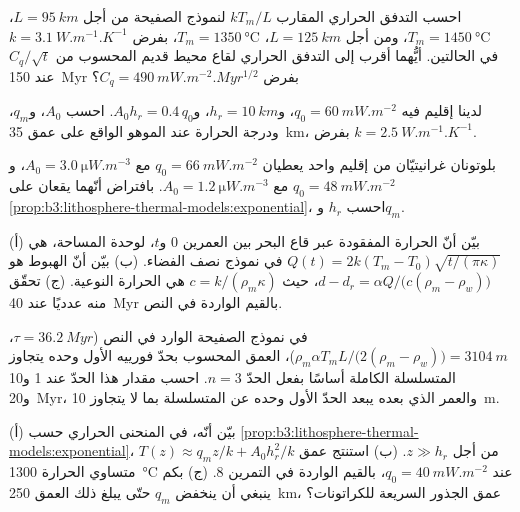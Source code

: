 \begin{exercise}[$\star\star$]\label{exo:b3:lithosphere-thermal-models:7}
احسب التدفق الحراري المقارب $kT_m/L$ لنموذج الصفيحة من أجل $L =
\qty{95}{km}$، $T_m = \qty{1450}{\celsius}$، ومن أجل $L = \qty{125}{km}$،
$T_m = \qty{1350}{\celsius}$، بفرض $k = \qty{3.1}{W.m^{-1}.K^{-1}}$ في الحالتين.
أيُّهما أقرب إلى التدفق الحراري لقاع محيط قديم المحسوب من $C_q/\sqrt t$
عند \qty{150}{Myr} بفرض $C_q = \qty{490}{mW.m^{-2}.Myr^{1/2}}$؟
\end{exercise}

\begin{exercise}[$\star\star$]\label{exo:b3:lithosphere-thermal-models:8}
لدينا إقليم فيه $q_0 = \qty{60}{mW.m^{-2}}$، و$h_r = \qty{10}{km}$، و$A_0h_r =
0.4\,q_0$. احسب $A_0$، و$q_m$، ودرجة الحرارة عند الموهو الواقع
على عمق \qty{35}{km}، بفرض $k = \qty{2.5}{W.m^{-1}.K^{-1}}$.
\end{exercise}

\begin{exercise}[$\star\star$]\label{exo:b3:lithosphere-thermal-models:9}
بلوتونان غرانيتيّان من إقليم واحد يعطيان $q_0 = \qty{66}{mW.m^{-2}}$ مع $A_0
= \qty{3.0}{\micro W.m^{-3}}$، و$q_0 = \qty{48}{mW.m^{-2}}$ مع $A_0 =
\qty{1.2}{\micro W.m^{-3}}$. بافتراض أنّهما يقعان على
\cref{prop:b3:lithosphere-thermal-models:exponential}، احسب $h_r$ و$q_m$.
\end{exercise}

\begin{exercise}[$\star\star\star$]\label{exo:b3:lithosphere-thermal-models:10}
(أ) بيّن أنّ الحرارة المفقودة عبر قاع البحر بين العمرين 0 و$t$، لوحدة
المساحة، هي $Q(t) = 2k(T_m - T_0)\sqrt{t/(\pi\kappa)}$ في نموذج نصف
الفضاء. (ب) بيّن أنّ الهبوط هو $d - d_r = \alpha Q/\bigl(c(\rho_m -
\rho_w)\bigr)$، حيث $c = k/(\rho_m\kappa)$ هي الحرارة النوعية. (ج) تحقّق منه
عدديًا عند \qty{40}{Myr} بالقيم الواردة في النص.
\end{exercise}

\begin{exercise}[$\star\star\star$]\label{exo:b3:lithosphere-thermal-models:11}
في نموذج الصفيحة الوارد في النص ($\tau = \qty{36.2}{Myr}$، $\rho_m\alpha T_mL/
\bigl(2(\rho_m - \rho_w)\bigr) = \qty{3104}{m}$)، العمق المحسوب بحدّ فورييه الأول وحده
يتجاوز المتسلسلة الكاملة أساسًا بفعل الحدّ $n = 3$.
احسب مقدار هذا الحدّ عند 1 و10 و\qty{20}{Myr}، والعمر الذي بعده
يبعد الحدّ الأول وحده عن المتسلسلة بما لا يتجاوز \qty{10}{m}.
\end{exercise}

\begin{exercise}[$\star\star\star$]\label{exo:b3:lithosphere-thermal-models:12}
(أ) بيّن أنّه، في المنحنى الحراري حسب \cref{prop:b3:lithosphere-thermal-models:exponential}،
$T(z) \approx q_mz/k + A_0h_r^2/k$ من أجل $z \gg h_r$. (ب) استنتج عمق
متساوي الحرارة \qty{1300}{\celsius} عند $q_0 = \qty{40}{mW.m^{-2}}$، بالقيم الواردة في
التمرين 8. (ج) بكم ينبغي أن ينخفض $q_m$ حتّى يبلغ ذلك العمق
\qty{250}{km}، عمق الجذور السريعة للكراتونات؟
\end{exercise}

